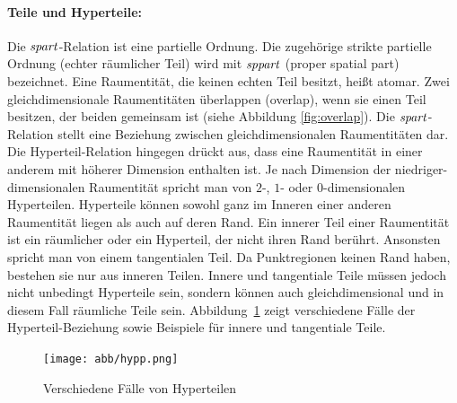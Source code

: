     \paragraph{Teile und Hyperteile:}
        Die
        $\mathit{spart}$-Relation ist eine partielle Ordnung. Die zugehörige strikte partielle Ordnung (echter räumlicher Teil) wird mit $\mathit{sppart}$ (proper spatial part) bezeichnet.
        Eine Raumentität, die keinen echten Teil besitzt, heißt atomar.
        Zwei gleichdimensionale Raumentitäten überlappen (overlap), wenn sie einen Teil besitzen, der beiden gemeinsam ist (siehe Abbildung \ref{fig:overlap}).
        Die $\mathit{spart}$-Relation stellt eine Beziehung zwischen gleichdimensionalen Raumentitäten dar.
        Die Hyperteil-Relation hingegen drückt aus, dass eine Raumentität in einer anderem mit höherer Dimension enthalten ist.
        Je nach Dimension der niedriger-dimensionalen Raumentität spricht man von $2$-, $1$- oder $0$-dimensionalen Hyperteilen.
        Hyperteile können sowohl ganz im Inneren einer anderen Raumentität liegen als auch auf deren Rand.
        Ein innerer Teil einer Raumentität ist ein räumlicher oder ein Hyperteil, der nicht ihren Rand berührt. 
        Ansonsten spricht man von einem tangentialen Teil.
        Da Punktregionen keinen Rand haben, bestehen sie nur aus inneren Teilen.
        Innere und tangentiale Teile müssen jedoch nicht unbedingt Hyperteile sein, sondern können auch gleichdimensional und in diesem Fall räumliche Teile sein.
        Abbildung~\ref{fig:hypp} zeigt verschiedene Fälle der Hyperteil-Beziehung sowie Beispiele für innere und tangentiale Teile.
        
        \begin{figure}[ht]
            \centering
            \texttt{[image: abb/hypp.png]}
            \caption{Verschiedene Fälle von Hyperteilen}
            \label{fig:hypp}
        \end{figure}

